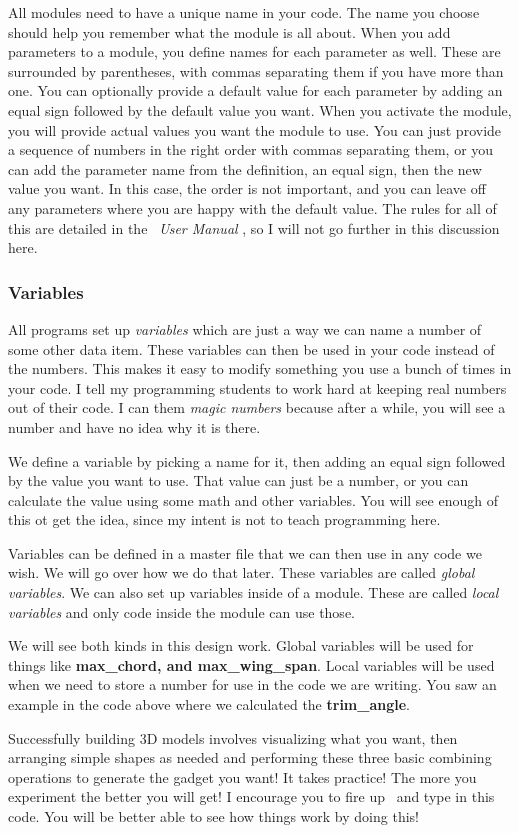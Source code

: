 All modules need to have a unique name in your code.  The name you choose should
help you remember what the module is all about. When you add parameters to a
module, you define names for each parameter as well. These are surrounded by
parentheses, with commas separating them if you have more than one. You can
optionally provide a default value for each parameter by adding an equal sign
followed by the default value you want. When you activate the module, you will
provide actual values you want the module to use. You can just provide a
sequence of numbers in the right order with commas separating them, or you can
add the parameter name from the definition, an equal sign, then the new value
you want. In this case, the order is not important, and you can leave off any
parameters where you are happy with the default value.  The rules for all of
this are detailed in the \osc\ {\it User Manual} \cite{userman}, so I will not
go further in this discussion here.

\subsubsection{Variables}

All programs set up {\it variables} which are just a way we can name a number of
some other data item. These variables can then be used in your code instead of
the numbers. This makes it easy to modify something you use a bunch of times in
your code. I tell my programming students to work hard at keeping real
numbers out of their code. I can them {\it magic numbers} because after a
while, you will see a number and have no idea why it is there.

We define a variable by picking a name for it, then adding an equal sign
followed by the value you want to use. That value can just be a number, or you
can calculate the value using some math and other variables. You will see enough
of this ot get the idea, since my intent is not to teach programming here.

Variables can be defined in a master file that we can then use in any code we
wish. We will go over how we do that later. These variables are called {\it
global variables}. We can also set up variables inside of a module. These are
called {\it local variables} and only code inside the module can use those. 

We will see both kinds in this design work. Global variables will be used for
things like {\bf max_chord, and max_wing_span}. Local variables will be used
when we need to store a number for use in the code we are writing. You saw an
example in the code above where we calculated the {\bf trim_angle}.

Successfully building 3D models involves visualizing what you want, then
arranging simple shapes as needed and performing these three basic combining
operations to generate the gadget you want! It takes practice! The more you
experiment the better you will get! I encourage you to fire up \osc\ and type
in this code. You will be better able to see how things work by doing this!

